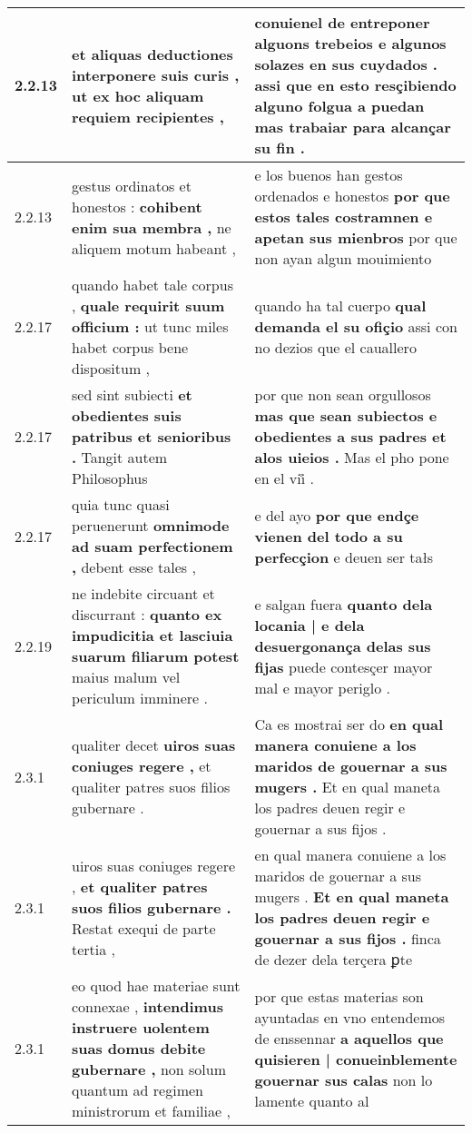 \begin{tabular}{|p{1cm}|p{6.5cm}|p{6.5cm}|}
2.2.13 & et aliquas deductiones \textbf{ interponere suis curis , } ut ex hoc aliquam requiem recipientes , & conuienel de entreponer alguons trebeios \textbf{ e algunos solazes en sus cuydados . } assi que en esto resçibiendo alguno folgua a puedan mas trabaiar para alcançar su fin . \\\hline
2.2.13 & gestus ordinatos et honestos : \textbf{ cohibent enim sua membra , } ne aliquem motum habeant , & e los buenos han gestos ordenados e honestos \textbf{ por que estos tales costramnen e apetan sus mienbros } por que non ayan algun mouimiento \\\hline
2.2.17 & quando habet tale corpus , \textbf{ quale requirit suum officium : } ut tunc miles habet corpus bene dispositum , & quando ha tal cuerpo \textbf{ qual demanda el su ofiçio } assi con no dezios que el cauallero \\\hline
2.2.17 & sed sint subiecti \textbf{ et obedientes suis patribus et senioribus . } Tangit autem Philosophus & por que non sean orgullosos \textbf{ mas que sean subiectos e obedientes a sus padres et alos uieios . } Mas el pho pone en el vii̊ . \\\hline
2.2.17 & quia tunc quasi peruenerunt \textbf{ omnimode ad suam perfectionem , } debent esse tales , & e del ayo \textbf{ por que endçe vienen del todo a su perfecçion } e deuen ser tałs \\\hline
2.2.19 & ne indebite circuant et discurrant : \textbf{ quanto ex impudicitia et lasciuia suarum filiarum potest } maius malum vel periculum imminere . & e salgan fuera \textbf{ quanto dela locania | e dela desuergonança delas sus fijas } puede contesçer mayor mal e mayor periglo . \\\hline
2.3.1 & qualiter decet \textbf{ uiros suas coniuges regere , } et qualiter patres suos filios gubernare . & Ca es mostrai ser do \textbf{ en qual manera conuiene a los maridos de gouernar a sus mugers . } Et en qual maneta los padres deuen regir e gouernar a sus fijos . \\\hline
2.3.1 & uiros suas coniuges regere , \textbf{ et qualiter patres suos filios gubernare . } Restat exequi de parte tertia , & en qual manera conuiene a los maridos de gouernar a sus mugers . \textbf{ Et en qual maneta los padres deuen regir e gouernar a sus fijos . } finca de dezer dela terçera ꝑte \\\hline
2.3.1 & eo quod hae materiae sunt connexae , \textbf{ intendimus instruere uolentem suas domus debite gubernare , } non solum quantum ad regimen ministrorum et familiae , & por que estas materias son ayuntadas en vno entendemos de enssennar \textbf{ a aquellos que quisieren | conueinblemente gouernar sus calas } non lo lamente quanto al \\\hline

\end{tabular}
